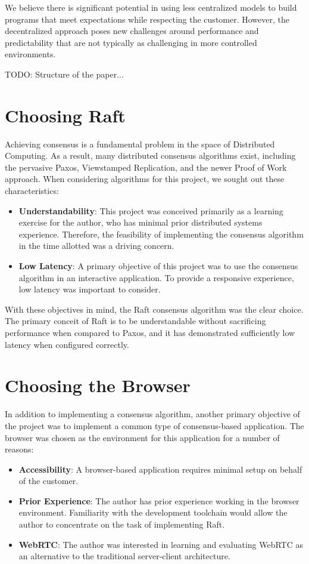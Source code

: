 \documentclass[11pt,twocolumn]{article}
\begin{document}
We believe there is significant potential in using less centralized models to build programs that meet expectations while respecting the customer. However, the decentralized approach poses new challenges around performance and predictability that are not typically as challenging in more controlled environments.

TODO: Structure of the paper...


\section{Choosing Raft}
Achieving consensus is a fundamental problem in the space of Distributed Computing. As a result, many distributed consensus algorithms exist, including the pervasive Paxos, Viewstamped Replication, and the newer Proof of Work approach. When considering algorithms for this project, we sought out these characteristics:
\begin{itemize}
    \item \textbf{Understandability}: This project was conceived primarily as a learning exercise for the author, who has minimal prior distributed systems experience. Therefore, the feasibility of implementing the consensus algorithm in the time allotted was a driving concern.
    \item \textbf{Low Latency}: A primary objective of this project was to use the consensus algorithm in an interactive application. To provide a responsive experience, low latency was important to consider.
\end{itemize}

With these objectives in mind, the Raft consensus algorithm was the clear choice. The primary conceit of Raft is to be understandable without sacrificing performance when compared to Paxos, and it has demonstrated sufficiently low latency when configured correctly.

\section{Choosing the Browser}
In addition to implementing a consensus algorithm, another primary objective of the project was to implement a common type of consensus-based application. The browser was chosen as the environment for this application for a number of reasons:

\begin{itemize}
    \item \textbf{Accessibility}: A browser-based application requires minimal setup on behalf of the customer.
    \item \textbf{Prior Experience}: The author has prior experience working in the browser environment. Familiarity with the development toolchain would allow the author to concentrate on the task of implementing Raft.
    \item \textbf{WebRTC}: The author was interested in learning and evaluating WebRTC as an alternative to the traditional server-client architecture.

\end{itemize}
\end{document}
